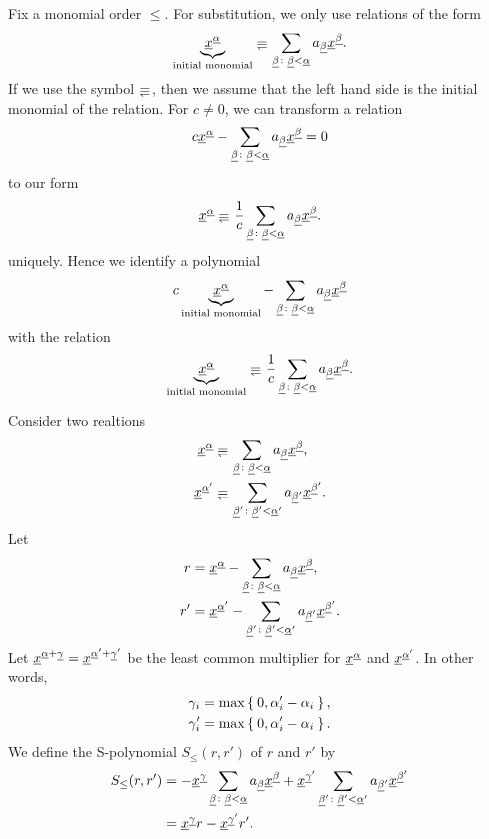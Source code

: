 Fix a monomial order $\leq$.
For substitution,
we only use relations of the form
\begin{align*}
  \underbrace{\xxx^\aaalpha}_{\text{initial monomial}}
  \denotes
  \sum_{\bbbeta\colon\bbbeta < \aaalpha}
  a_\bbbeta \xxx^\bbbeta.
\end{align*}
If we use the symbol $\denotes$,
then we assume that the left hand side is the initial monomial of
the relation.
For $c\neq 0$,
we can transform a relation
\begin{align*}
  c{\underline{x}}^{\underline{\alpha}}
  -
  \sum_{{\underline{\beta}}\colon{\underline{\beta}} < {\underline{\alpha}}}
  a_{\underline{\beta}} {\underline{x}}^{\underline{\beta}}
  =0
\end{align*}
to our form
\begin{align*}
  \xxx^\aaalpha
  \denotes
  \frac{1}{c}\sum_{\bbbeta\colon\bbbeta < \aaalpha}
  a_\bbbeta \xxx^\bbbeta.
\end{align*}
uniquely.
Hence  we identify a polynomial
\begin{align*}
  c\underbrace{{\underline{x}}^{\underline{\alpha}}}_{\text{initial monomial}}
  -
  \sum_{{\underline{\beta}}\colon{\underline{\beta}} < {\underline{\alpha}}}
  a_{\underline{\beta}} {\underline{x}}^{\underline{\beta}}
\end{align*}
with the relation
\begin{align*}
  \underbrace{\xxx^\aaalpha}_{\text{initial monomial}}
  \denotes
  \frac{1}{c}\sum_{\bbbeta\colon\bbbeta < \aaalpha}
  a_\bbbeta \xxx^\bbbeta.
\end{align*}

\begin{definition}[S-polynomial]
  Consider two realtions
\begin{align*}
  \xxx^\aaalpha
  &\denotes
  \sum_{\bbbeta\colon\bbbeta < \aaalpha}
  a_\bbbeta \xxx^\bbbeta,\\
  \xxx^{\aaalpha'}
  &\denotes
  \sum_{\bbbeta'\colon\bbbeta' < \aaalpha'}
  a_{\bbbeta'} \xxx^{\bbbeta'}.
\end{align*}
Let
\begin{align*}
  r&={\underline{x}}^{{\underline{\alpha}}}-\sum_{{\underline{\beta}}\colon{\underline{\beta}} < {\underline{\alpha}}} a_{\underline{\beta}} {\underline{x}}^{\underline{\beta}},\\
  r'&={\underline{x}}^{{\underline{\alpha}}'}-\sum_{{\underline{\beta}}'\colon{\underline{\beta}}' < {\underline{\alpha}}'} a_{{\underline{\beta}}'} {\underline{x}}^{{\underline{\beta}}'}.
\end{align*}
Let ${\underline{x}}^{{\underline{\alpha}}+{\underline{\gamma}}}={\underline{x}}^{{\underline{\alpha}}'+{\underline{\gamma}}'}$
be  the least common multiplier for ${\underline{x}}^{{\underline{\alpha}}}$ and ${\underline{x}}^{{\underline{\alpha}}'}$.
In other words,
\begin{align*}
  \gamma_i&=\max\Set{0,\alpha_i'-\alpha_i},\\
  \gamma'_i&=\max\Set{0,\alpha_i'-\alpha_i}.
\end{align*}
We define the S-polynomial $S_{\leq}(r,r')$ of $r$ and  $r'$ by
\begin{align*}
  S_{\leq}(r,r')&=
  -{\underline{x}}^{{\underline{\gamma}}}\sum_{{\underline{\beta}}\colon{\underline{\beta}} < {\underline{\alpha}}} a_{\underline{\beta}} {\underline{x}}^{\underline{\beta}}
  +{\underline{x}}^{{\underline{\gamma}}'}\sum_{{\underline{\beta}}'\colon{\underline{\beta}}' < {\underline{\alpha}}'} a_{{\underline{\beta}}'} {\underline{x}}^{{\underline{\beta}}'}\\
&={\underline{x}}^{\underline{\gamma}} r- {\underline{x}}^{{\underline{\gamma}}'}r'.
\end{align*}
\end{definition}

